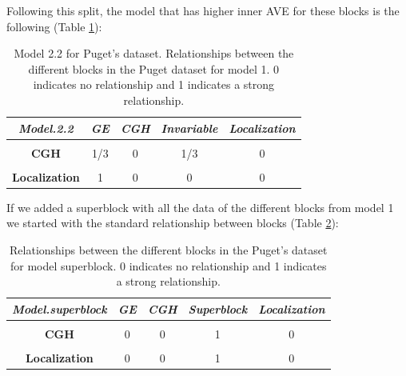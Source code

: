 \documentclass[
  12pt,
  a4paper,
  twoside,
  openright]{book}
\begin{document}
Following this split, the model that has higher inner AVE for these blocks is the following (Table \ref{tab:puget-model2-2}):

\begin{table}[H]

\caption[Model 2.2 the for Puget's dataset.]{\label{tab:puget-model2-2}Model 2.2 for Puget's dataset. Relationships between the different blocks in the Puget dataset for model 1. 0 indicates no relationship and 1 indicates a strong relationship.}
\centering
\begin{tabular}[t]{|>{}c|c|c|c|>{}c|}
\hline
\em{\textbf{Model.2.2}} & \em{\textbf{GE}} & \em{\textbf{CGH}} & \em{\textbf{Invariable}} & \em{\textbf{Localization}}\\
\hline
\textbf{\cellcolor{gray!6}{GE}} & \cellcolor{gray!6}{1} & \cellcolor{gray!6}{1/3} & \cellcolor{gray!6}{0} & \cellcolor{gray!6}{1}\\
\hline
\textbf{CGH} & 1/3 & 0 & 1/3 & 0\\
\hline
\textbf{\cellcolor{gray!6}{Invariable}} & \cellcolor{gray!6}{0} & \cellcolor{gray!6}{1/3} & \cellcolor{gray!6}{0} & \cellcolor{gray!6}{0}\\
\hline
\textbf{Localization} & 1 & 0 & 0 & 0\\
\hline
\end{tabular}
\end{table}

If we added a superblock with all the data of the different blocks from model 1 we started with the standard relationship between blocks (Table \ref{tab:puget-model-superblock}):

\begin{table}[H]

\caption[Model with superblock for Puget's dataset.]{\label{tab:puget-model-superblock}Relationships between the different blocks in the Puget's dataset for model superblock. 0 indicates no relationship and 1 indicates a strong relationship.}
\centering
\begin{tabular}[t]{|>{}c|c|c|c|>{}c|}
\hline
\em{\textbf{Model.superblock}} & \em{\textbf{GE}} & \em{\textbf{CGH}} & \em{\textbf{Superblock}} & \em{\textbf{Localization}}\\
\hline
\textbf{\cellcolor{gray!6}{GE}} & \cellcolor{gray!6}{0} & \cellcolor{gray!6}{0} & \cellcolor{gray!6}{1} & \cellcolor{gray!6}{0}\\
\hline
\textbf{CGH} & 0 & 0 & 1 & 0\\
\hline
\textbf{\cellcolor{gray!6}{Superblock}} & \cellcolor{gray!6}{1} & \cellcolor{gray!6}{1} & \cellcolor{gray!6}{0} & \cellcolor{gray!6}{1}\\
\hline
\textbf{Localization} & 0 & 0 & 1 & 0\\
\hline
\end{tabular}
\end{table}
\end{document}
